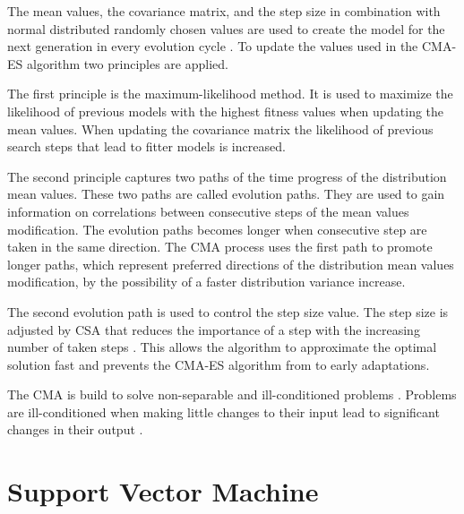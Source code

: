 The mean values, the covariance matrix, and the step size in combination with normal distributed randomly chosen values are used to create the model for the next generation in every evolution cycle \cite{Wikipedia2017CMA-ES}.
To update the values used in the \ac{CMA-ES} algorithm two principles are applied.

The first principle is the maximum-likelihood method.
It is used to maximize the likelihood of previous models with the highest fitness values when updating the mean values.
When updating the covariance matrix the likelihood of previous search steps that lead to fitter models is increased.

The second principle captures two paths of the time progress of the distribution mean values.
These two paths are called evolution paths.
They are used to gain information on correlations between consecutive steps of the mean values modification.
The evolution paths becomes longer when consecutive step are taken in the same direction. %
The \ac{CMA} process uses the first path to promote longer paths, which represent preferred directions of the distribution mean values modification, by the possibility of a faster distribution variance increase. %

The second evolution path is used to control the step size value.
The step size is adjusted by \ac{CSA} that reduces the importance of a step with the increasing number of taken steps \cite{Chotard2012CumulativeFunctions}.
This allows the algorithm to approximate the optimal solution fast and prevents the \ac{CMA-ES} algorithm from to early adaptations. 

The \ac{CMA} is build to solve non-separable and ill-conditioned problems \cite{Hansen2011TheTutorial}.
Problems are ill-conditioned when making little changes to their input lead to significant changes in their output \cite{Wikipedia2016ConditionNumber}.


\section{Support Vector Machine}
\label{sec:svm}

